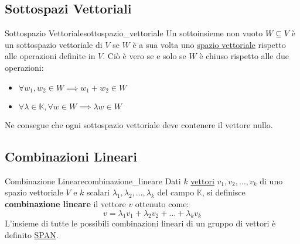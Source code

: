 \documentclass{article}
\begin{document}
\subsection{Sottospazi Vettoriali}

\begin{definition}{Sottospazio Vettoriale}{sottospazio_vettoriale}
    Un sottoinsieme non vuoto $W \subseteq V$ è un sottospazio vettoriale di $V$ se $W$ è a sua volta uno \hyperref[def:spazio_vettoriale]{spazio vettoriale} rispetto alle operazioni definite in $V$. Ciò è vero se e solo se $W$ è chiuso rispetto alle due operazioni:
    \begin{itemize}
        \item $\forall w_1, w_2 \in W \implies w_1 + w_2 \in W$
        \item $\forall \lambda \in \mathbb{K}, \forall w \in W \implies \lambda w \in W$
    \end{itemize}
    Ne consegue che ogni sottospazio vettoriale deve contenere il vettore nullo.
\end{definition}

\subsection{Combinazioni Lineari}

\begin{definition}{Combinazione Lineare}{combinazione_lineare}
    Dati $k$ \hyperref[def:vettore]{vettori} $v_1, v_2, \dots, v_k$ di uno spazio vettoriale $V$ e $k$ scalari $\lambda_1, \lambda_2, \dots, \lambda_k$ del campo $\mathbb{K}$, si definisce \textbf{combinazione lineare} il vettore $v$ ottenuto come:
    \[ v = \lambda_1 v_1 + \lambda_2 v_2 + \dots + \lambda_k v_k \]
    L'insieme di tutte le possibili combinazioni lineari di un gruppo di vettori è definito \hyperref[def:funzione_span]{SPAN}.
\end{definition}
\end{document}
